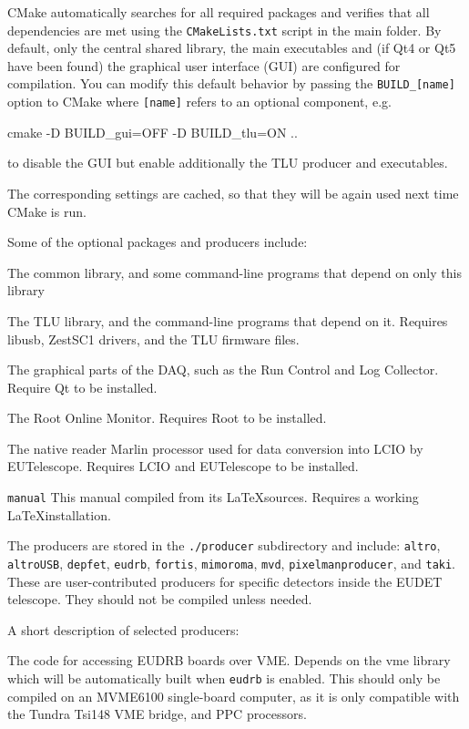 CMake automatically searches for all required packages and verifies
that all dependencies are met using the \texttt{CMakeLists.txt} script in the
main folder. By default, only the central shared library, the main
executables and (if Qt4 or Qt5 have been found) the graphical user
interface (GUI) are configured for compilation. You can modify this
default behavior by passing the \texttt{BUILD\_[name]} option to
CMake where \texttt{[name]} refers to an optional component, e.g.
\begin{listing}[mybash]
cmake -D BUILD_gui=OFF -D BUILD_tlu=ON ..
\end{listing}
to disable the GUI but enable additionally the TLU producer and
executables.

The corresponding settings are cached, so that they will be again used
next time CMake is run.

Some of the optional packages and producers include:
\begin{description}

The common library, and some command-line programs that depend on only this library

The \gls{TLU} library, and the command-line programs that depend on
it. Requires libusb, ZestSC1 drivers, and the TLU firmware files.

The graphical parts of the DAQ, such as the Run Control and Log
Collector. Require Qt to be installed.

The Root Online Monitor. Requires Root to be installed.

The native reader Marlin processor used for data conversion into LCIO
by EUTelescope. Requires LCIO and EUTelescope to be installed.

\texttt{manual}
This manual compiled from its \LaTeX sources. Requires a working
\LaTeX installation.

\end{description}

The producers are stored in the \texttt{./producer} subdirectory and
include: \texttt{altro}, \texttt{altroUSB}, \texttt{depfet},
\texttt{eudrb}, \texttt{fortis}, \texttt{mimoroma}, \texttt{mvd},
\texttt{pixelmanproducer}, and \texttt{taki}. These are
user-contributed producers for specific detectors inside the EUDET
telescope.  They should not be compiled unless needed.

A short description of selected producers:
\begin{description}

The code for accessing EUDRB boards over VME.  Depends
on the vme library which will be automatically built
when \texttt{eudrb} is enabled. This should only be compiled on an
MVME6100 single-board computer, as it is only compatible with the
Tundra Tsi148 VME bridge, and PPC processors.
\end{description}



